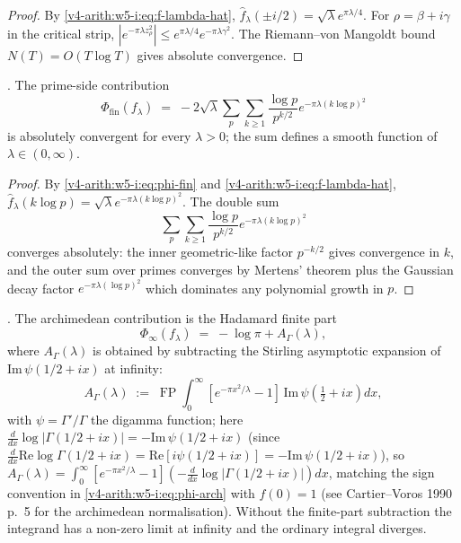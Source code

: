 \begin{proof}
By \eqref{v4-arith:w5-i:eq:f-lambda-hat},
\(\widehat{f}_{\lambda}(\pm i/2)=\sqrt{\lambda}e^{\pi\lambda/4}\).
For \(\rho=\beta+i\gamma\) in the critical strip,
\(|e^{-\pi\lambda z_{\rho}^{2}}|
\leq e^{\pi\lambda/4}e^{-\pi\lambda\gamma^{2}}\). The
Riemann--von Mangoldt bound \(N(T)=O(T\log T)\) gives absolute
convergence.
\end{proof}

\begin{lemma}
\label{v4-arith:w5-i:lem:prime-side}
\ClaimStatusProvedHere. The prime-side contribution
\begin{equation}
\label{v4-arith:w5-i:eq:phi-fin-eval}
\Phi_{\mathrm{fin}}(f_{\lambda})\;=\;-2\sqrt{\lambda}\sum_{p}\sum_{k\geq 1}\frac{\log p}{p^{k/2}}e^{-\pi\lambda(k\log p)^{2}}
\end{equation}
is absolutely convergent for every \(\lambda>0\); the sum defines a
smooth function of \(\lambda\in(0,\infty)\).
\end{lemma}

\begin{proof}
By \eqref{v4-arith:w5-i:eq:phi-fin} and
\eqref{v4-arith:w5-i:eq:f-lambda-hat},
\(\widehat{f}_{\lambda}(k\log p)=\sqrt{\lambda}e^{-\pi\lambda(k\log p)^{2}}\).
The double sum
\[
\sum_{p}\sum_{k\geq 1}\frac{\log p}{p^{k/2}}e^{-\pi\lambda(k\log p)^{2}}
\]
converges absolutely: the inner geometric-like factor
\(p^{-k/2}\) gives convergence in \(k\), and the outer sum over primes
converges by Mertens' theorem plus the Gaussian decay factor
\(e^{-\pi\lambda(\log p)^{2}}\) which dominates any polynomial growth
in \(p\).
\end{proof}

\begin{lemma}
\label{v4-arith:w5-i:lem:arch}
\ClaimStatusProvedHere. The archimedean contribution is the
Hadamard finite part
\begin{equation}
\label{v4-arith:w5-i:eq:phi-arch-eval}
\Phi_{\infty}(f_{\lambda})\;=\;-\log\pi+A_{\Gamma}(\lambda),
\end{equation}
where \(A_{\Gamma}(\lambda)\) is obtained by subtracting the Stirling
asymptotic expansion of \(\mathrm{Im}\,\psi(1/2+ix)\) at infinity:
\begin{equation}
\label{v4-arith:w5-i:eq:A-gamma}
A_{\Gamma}(\lambda)\;:=\;\operatorname{FP}\!\int_{0}^{\infty}[e^{-\pi x^{2}/\lambda}-1]\,\mathrm{Im}\,\psi\!\left(\tfrac{1}{2}+ix\right)dx,
\end{equation}
with \(\psi = \Gamma'/\Gamma\) the digamma function; here
\(\frac{d}{dx}\log|\Gamma(1/2+ix)| = -\mathrm{Im}\,\psi(1/2+ix)\)
(since \(\frac{d}{dx}\mathrm{Re}\log\Gamma(1/2+ix)
= \mathrm{Re}[i\psi(1/2+ix)] = -\mathrm{Im}\,\psi(1/2+ix)\)),
so \(A_{\Gamma}(\lambda) = \int_{0}^{\infty}[e^{-\pi x^{2}/\lambda}-1](-\frac{d}{dx}\log|\Gamma(1/2+ix)|)dx\),
matching the sign convention in \eqref{v4-arith:w5-i:eq:phi-arch}
with \(f(0)=1\) (see Cartier--Voros 1990 p.~5 for the archimedean
normalisation). Without the finite-part subtraction the integrand has
a non-zero limit at infinity and the ordinary integral diverges.
\end{lemma}

